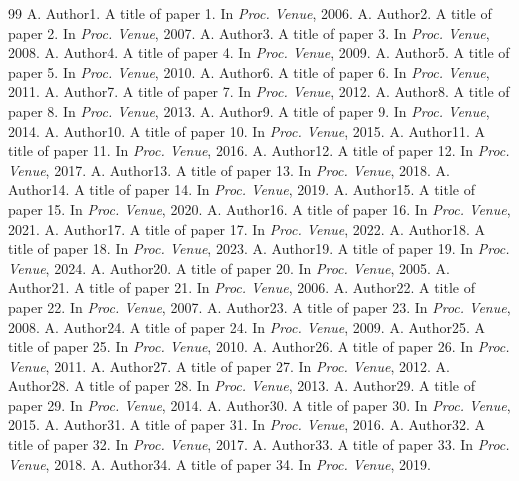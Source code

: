 \documentclass[twocolumn]{article}
\begin{document}
\begin{thebibliography}{99}
 A. Author1. A title of paper 1. In \emph{Proc. Venue}, 2006.
 A. Author2. A title of paper 2. In \emph{Proc. Venue}, 2007.
 A. Author3. A title of paper 3. In \emph{Proc. Venue}, 2008.
 A. Author4. A title of paper 4. In \emph{Proc. Venue}, 2009.
 A. Author5. A title of paper 5. In \emph{Proc. Venue}, 2010.
 A. Author6. A title of paper 6. In \emph{Proc. Venue}, 2011.
 A. Author7. A title of paper 7. In \emph{Proc. Venue}, 2012.
 A. Author8. A title of paper 8. In \emph{Proc. Venue}, 2013.
 A. Author9. A title of paper 9. In \emph{Proc. Venue}, 2014.
 A. Author10. A title of paper 10. In \emph{Proc. Venue}, 2015.
 A. Author11. A title of paper 11. In \emph{Proc. Venue}, 2016.
 A. Author12. A title of paper 12. In \emph{Proc. Venue}, 2017.
 A. Author13. A title of paper 13. In \emph{Proc. Venue}, 2018.
 A. Author14. A title of paper 14. In \emph{Proc. Venue}, 2019.
 A. Author15. A title of paper 15. In \emph{Proc. Venue}, 2020.
 A. Author16. A title of paper 16. In \emph{Proc. Venue}, 2021.
 A. Author17. A title of paper 17. In \emph{Proc. Venue}, 2022.
 A. Author18. A title of paper 18. In \emph{Proc. Venue}, 2023.
 A. Author19. A title of paper 19. In \emph{Proc. Venue}, 2024.
 A. Author20. A title of paper 20. In \emph{Proc. Venue}, 2005.
 A. Author21. A title of paper 21. In \emph{Proc. Venue}, 2006.
 A. Author22. A title of paper 22. In \emph{Proc. Venue}, 2007.
 A. Author23. A title of paper 23. In \emph{Proc. Venue}, 2008.
 A. Author24. A title of paper 24. In \emph{Proc. Venue}, 2009.
 A. Author25. A title of paper 25. In \emph{Proc. Venue}, 2010.
 A. Author26. A title of paper 26. In \emph{Proc. Venue}, 2011.
 A. Author27. A title of paper 27. In \emph{Proc. Venue}, 2012.
 A. Author28. A title of paper 28. In \emph{Proc. Venue}, 2013.
 A. Author29. A title of paper 29. In \emph{Proc. Venue}, 2014.
 A. Author30. A title of paper 30. In \emph{Proc. Venue}, 2015.
 A. Author31. A title of paper 31. In \emph{Proc. Venue}, 2016.
 A. Author32. A title of paper 32. In \emph{Proc. Venue}, 2017.
 A. Author33. A title of paper 33. In \emph{Proc. Venue}, 2018.
 A. Author34. A title of paper 34. In \emph{Proc. Venue}, 2019.

\end{thebibliography}
\end{document}
